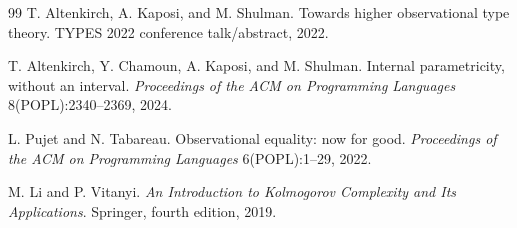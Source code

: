 \documentclass{lmcs}
\theoremstyle{plain}
\theoremstyle{definition}
\theoremstyle{remark}
\begin{document}
\begin{thebibliography}{99}
T. Altenkirch, A. Kaposi, and M. Shulman.
Towards higher observational type theory.
TYPES 2022 conference talk/abstract, 2022.

T. Altenkirch, Y. Chamoun, A. Kaposi, and M. Shulman.
Internal parametricity, without an interval.
\emph{Proceedings of the ACM on Programming Languages} 8(POPL):2340--2369, 2024.

L. Pujet and N. Tabareau.
Observational equality: now for good.
\emph{Proceedings of the ACM on Programming Languages} 6(POPL):1--29, 2022.

M. Li and P. Vitanyi.
\emph{An Introduction to Kolmogorov Complexity and Its Applications}.
Springer, fourth edition, 2019.

\end{thebibliography}
\end{document}
